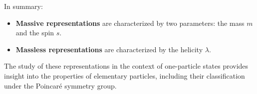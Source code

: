 In summary:
\begin{itemize}
    \item \textbf{Massive representations} are characterized by two parameters: the mass $m$ and the spin $s$.
    \item \textbf{Massless representations} are characterized by the helicity $\lambda$.
\end{itemize}

The study of these representations in the context of one-particle states provides insight into the properties of elementary particles, including their classification under the Poincaré symmetry group.


\color{black}